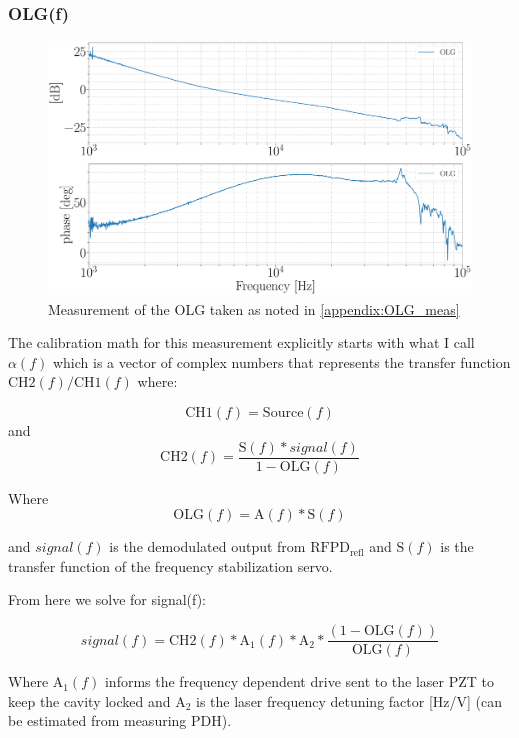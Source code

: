 \subsubsection{OLG(f)}
\begin{figure}[H]
  \begin{center}
    \includegraphics[width=\textwidth]{figs/ALGAAS/tfs/OLG.pdf}
    \caption{Measurement of the OLG taken as noted in \autoref{appendix:OLG_meas}}
  \end{center}
  \label{fig:OLGmeas}
\end{figure}


The calibration math for this measurement explicitly starts with what I
call \(\alpha(f)\) which is a vector of complex numbers that represents
the transfer function \(\mathrm{CH2}(f)/\mathrm{CH1}(f)\) where:

\[\mathrm{CH1}(f) = \mathrm{Source}(f)\] and
\[\mathrm{CH2}(f) = \frac{\mathrm{S}(f)* signal(f)}{1-\mathrm{OLG}(f)}\]

Where \[\mathrm{OLG}(f) = \mathrm{A}(f)* \mathrm{S}(f)\]

and \(signal(f)\) is the demodulated output from
\(\mathrm{RFPD}_\mathrm{refl}\) and \(\mathrm{S}(f)\) is the transfer
function of the frequency stabilization servo.

From here we solve for signal(f):

\[signal(f) = \mathrm{CH2}(f) * \mathrm{A}_{1}(f) * \mathrm{A}_2* \frac{(1-\mathrm{OLG}(f))}{\mathrm{OLG}(f)}\]

Where \(\mathrm{A}_{1}(f)\) informs the frequency dependent drive sent
to the laser PZT to keep the cavity locked and \(\mathrm{A}_2\) is the
laser frequency detuning factor {[}Hz/V{]} (can be estimated from
measuring PDH).

